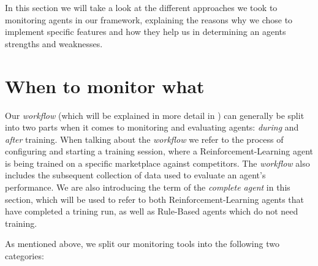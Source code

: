 \begin{jointwork}\label{ch:Approaches}
	In this section we will take a look at the different approaches we took to monitoring agents in our framework, explaining the reasons why we chose to implement specific features and how they help us in determining an agents strengths and weaknesses.
\end{jointwork}

\section{When to monitor what}\label{sec:WhenToMonitorWhat}

Our \emph{workflow} (which will be explained in more detail in ) can generally be split into two parts when it comes to monitoring and evaluating agents: \emph{during} and \emph{after} training. When talking about the \emph{workflow} we refer to the process of configuring and starting a training session, where a Reinforcement-Learning agent is being trained on a specific marketplace against competitors. The \emph{workflow} also includes the subsequent collection of data used to evaluate an agent's performance. We are also introducing the term of the \emph{complete agent} in this section, which will be used to refer to both Reinforcement-Learning agents that have completed a trining run, as well as Rule-Based agents which do not need training.

As mentioned above, we split our monitoring tools into the following two categories:


